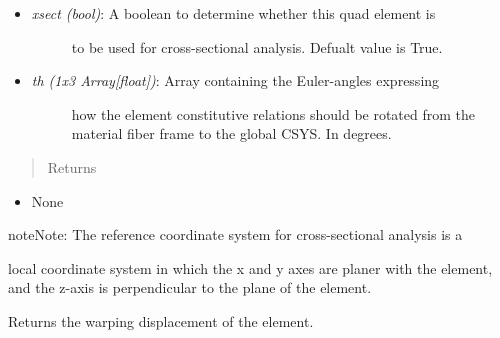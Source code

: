 \documentclass[letterpaper,10pt,english]{sphinxmanual}
\begin{document}
\begin{fulllineitems}
\begin{fulllineitems}
\begin{itemize}
\item {} \begin{description}
\item[{\emph{xsect (bool)}: A boolean to determine whether this quad element is}] \leavevmode
to be used for cross-sectional analysis. Defualt value is True.

\end{description}

\item {} \begin{description}
\item[{\emph{th (1x3 Array{[}float{]})}: Array containing the Euler-angles expressing}] \leavevmode
how the element constitutive relations should be rotated from
the material fiber frame to the global CSYS. In degrees.

\end{description}

\end{itemize}
\begin{quote}\begin{description}
\item[{Returns}] \leavevmode
\end{description}\end{quote}
\begin{itemize}
\item {} 
None

\end{itemize}

\begin{notice}{note}{Note:}
The reference coordinate system for cross-sectional analysis is a
\end{notice}

local coordinate system in which the x and y axes are planer with the
element, and the z-axis is perpendicular to the plane of the element.

\end{fulllineitems}


\begin{fulllineitems}
\label{structures:AeroComBAT.Structures.CQUADX.getDeformed}
Returns the warping displacement of the element.


\end{fulllineitems}
\end{fulllineitems}
\end{document}
